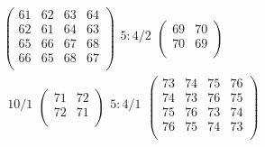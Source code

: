 \documentclass[12pt,a4paper]{amsart}
\begin{document}
\begin{align*}
\left(\begin{array}{rr|rr}%
61&62&63&64\\%
62&61&64&63\\\hline%
65&66&67&68\\%
66&65&68&67\\%
\end{array}\right)%
\begin{array}{r}%
5:4/2\\%
\end{array}%
\left(\begin{array}{rr}%
69&70\\%
70&69\\%
\end{array}\right)%
\\
\begin{array}{r}%
10/1\\%
\end{array}%
\left(\begin{array}{rr}%
71&72\\%
72&71\\%
\end{array}\right)%
\begin{array}{r}%
5:4/1\\%
\end{array}%
\left(\begin{array}{rrrr}%
73&74&75&76\\%
74&73&76&75\\%
75&76&73&74\\%
76&75&74&73\\%
\end{array}\right)%
\end{align*}
\end{document}
